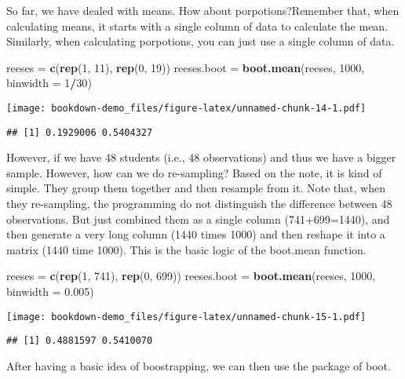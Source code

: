 \documentclass[]{book}
\newenvironment{Shaded}{\begin{snugshade}}{\end{snugshade}}
\newcommand{\DataTypeTok}[1]{\textcolor[rgb]{0.13,0.29,0.53}{#1}}
\newcommand{\DecValTok}[1]{\textcolor[rgb]{0.00,0.00,0.81}{#1}}
\newcommand{\FloatTok}[1]{\textcolor[rgb]{0.00,0.00,0.81}{#1}}
\newcommand{\KeywordTok}[1]{\textcolor[rgb]{0.13,0.29,0.53}{\textbf{#1}}}
\newcommand{\NormalTok}[1]{#1}
\newcommand{\OperatorTok}[1]{\textcolor[rgb]{0.81,0.36,0.00}{\textbf{#1}}}
\newcommand{\StringTok}[1]{\textcolor[rgb]{0.31,0.60,0.02}{#1}}
\begin{document}
So far, we have dealed with means. How about porpotions?Remember that, when calculating means, it starts with a single column of data to calculate the mean. Similarly, when calculating porpotions, you can just use a single column of data.

\begin{Shaded}
\begin{Highlighting}[]
\NormalTok{reeses =}\StringTok{ }\KeywordTok{c}\NormalTok{(}\KeywordTok{rep}\NormalTok{(}\DecValTok{1}\NormalTok{, }\DecValTok{11}\NormalTok{), }\KeywordTok{rep}\NormalTok{(}\DecValTok{0}\NormalTok{, }\DecValTok{19}\NormalTok{))}
\NormalTok{reeses.boot =}\StringTok{ }\KeywordTok{boot.mean}\NormalTok{(reeses, }\DecValTok{1000}\NormalTok{, }\DataTypeTok{binwidth =} \DecValTok{1}\OperatorTok{/}\DecValTok{30}\NormalTok{)}
\end{Highlighting}
\end{Shaded}

\texttt{[image: bookdown-demo\_files/figure-latex/unnamed-chunk-14-1.pdf]}

\begin{verbatim}
## [1] 0.1929006 0.5404327
\end{verbatim}

However, if we have 48 students (i.e., 48 observations) and thus we have a bigger sample. However, how can we do re-sampling? Based on the note, it is kind of simple. They group them together and then resample from it. Note that, when they re-sampling, the programming do not distinguish the difference between 48 observations. But just combined them as a single column (741+699=1440), and then generate a very long column (1440 times 1000) and then reshape it into a matrix (1440 time 1000). This is the basic logic of the boot.mean function.

\begin{Shaded}
\begin{Highlighting}[]
\NormalTok{reeses =}\StringTok{ }\KeywordTok{c}\NormalTok{(}\KeywordTok{rep}\NormalTok{(}\DecValTok{1}\NormalTok{, }\DecValTok{741}\NormalTok{), }\KeywordTok{rep}\NormalTok{(}\DecValTok{0}\NormalTok{, }\DecValTok{699}\NormalTok{))}
\NormalTok{reeses.boot =}\StringTok{ }\KeywordTok{boot.mean}\NormalTok{(reeses, }\DecValTok{1000}\NormalTok{, }\DataTypeTok{binwidth =} \FloatTok{0.005}\NormalTok{)}
\end{Highlighting}
\end{Shaded}

\texttt{[image: bookdown-demo\_files/figure-latex/unnamed-chunk-15-1.pdf]}

\begin{verbatim}
## [1] 0.4881597 0.5410070
\end{verbatim}

After having a basic idea of boostrapping, we can then use the package of boot.


\end{document}
